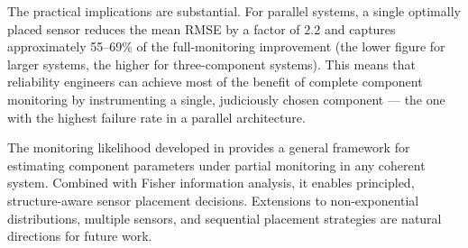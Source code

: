 \documentclass[12pt]{article}
\theoremstyle{definition}
\theoremstyle{remark}
\begin{document}
The practical implications are substantial.  For parallel systems, a
single optimally placed sensor reduces the mean RMSE by a factor of
$2.2$ and captures approximately 55--69\% of the full-monitoring
improvement (the lower figure for larger systems, the higher for
three-component systems).  This means that reliability engineers can
achieve most of the benefit of complete component monitoring by
instrumenting a single, judiciously chosen component --- the one with
the highest failure rate in a parallel architecture.

The monitoring likelihood developed in  provides
a general framework for estimating component parameters under partial
monitoring in any coherent system.  Combined with Fisher information
analysis, it enables principled, structure-aware sensor placement
decisions.  Extensions to non-exponential distributions, multiple
sensors, and sequential placement strategies are natural directions
for future work.





\end{document}
